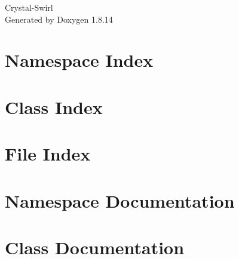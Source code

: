 \documentclass[twoside]{book}
\newcommand{\+}{\discretionary{\mbox{\scriptsize$\hookleftarrow$}}{}{}}
\newcommand{\clearemptydoublepage}{%
  \newpage{\pagestyle{empty}\cleardoublepage}%
}
\begin{document}
\begin{titlepage}
\vspace*{7cm}
\begin{center}%
{\Large Crystal-\/\+Swirl }\\
\vspace*{1cm}
{\large Generated by Doxygen 1.8.14}\\
\end{center}
\end{titlepage}
\clearemptydoublepage
{}
\tableofcontents
\clearemptydoublepage
{}

\chapter{Namespace Index}

\chapter{Class Index}

\chapter{File Index}

\chapter{Namespace Documentation}












\chapter{Class Documentation}






















\end{document}
